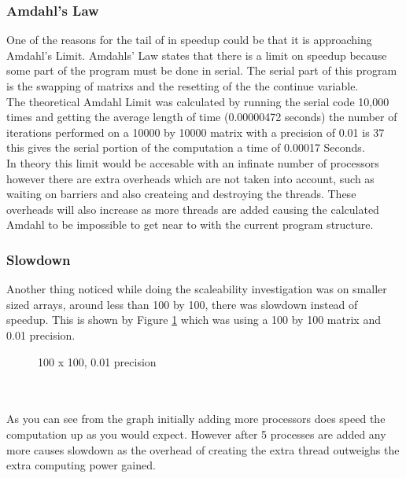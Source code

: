 \documentclass{article}
\begin{document}
 \subsubsection{Amdahl’s Law}
 One of the reasons for the tail of in speedup could be that it is approaching
 Amdahl's Limit. Amdahls' Law states that there is a limit on speedup because
 some part of the program must be done in serial. The serial part of this program
 is the swapping of matrixs and the resetting of the the continue variable.\\
 The theoretical Amdahl Limit was calculated by running the serial code 10,000
 times and getting the average length of time (0.00000472 seconds) the number of
 iterations performed on a 10000 by 10000 matrix with a precision of 0.01 is 37
 this gives the serial portion of the computation a time of 0.00017 Seconds.\\
 In theory this limit would be accesable with an infinate number of processors
 however there are extra overheads which are not taken into account, such as waiting
 on barriers and also createing and destroying the threads. These overheads will also
 increase as more threads are added causing the calculated Amdahl to be impossible to
 get near to with the current program structure.

\subsubsection{Slowdown}

Another thing noticed while doing the scaleability investigation was on smaller
sized arrays, around less than 100 by 100, there was slowdown instead of speedup.
This is shown by Figure \ref{fig:slowdown} which was using a 100 by 100 matrix and 0.01
precision.

\begin{figure}[H]
 \centering
 \caption{100 x 100, 0.01 precision}
 \label{fig:slowdown}
\end{figure}\\~\\

As you can see from the graph initially adding more processors does speed the
computation up as you would expect. However after 5 processes are added any more causes
slowdown as the overhead of creating the extra thread outweighs the extra computing
power gained.
\end{document}
